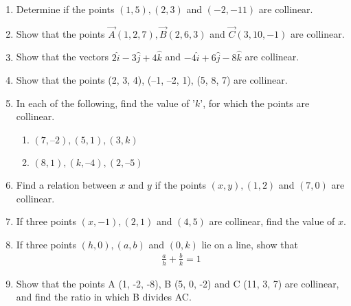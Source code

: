 \begin{enumerate}[label=\thesection.\arabic*,ref=\thesection.\theenumi]
\item Determine if the points $(1,5),(2,3)$ and $(-2,-11)$ are collinear.
	\\
		
\item Show that the points $\vec{A}(1,2,7), \vec{B}(2,6,3)$ and $\vec{C}(3,10,-1)$ are collinear.
	\\
	\solution
		
\item Show that the vectors $2\hat{i}-3\hat{j}+4\hat{k}$ and $-4\hat{i}+6\hat{j}-8\hat{k}$ are collinear.
   \\ 
    \solution 
		
\item Show that the points (2, 3, 4), (–1, –2, 1), (5, 8, 7) are collinear.
		\\
		\solution
		
\item In each of the following, find the value of '$k$', for which the points are collinear.
\begin{enumerate}
\item $(7, –2), (5, 1), (3, k)$
\item $(8, 1), (k, – 4), (2, –5)$
\end{enumerate}
		\label{10/7/3/2}
\solution
		
\item Find a relation between $x$ and $y$ if the points $(x, y), (1, 2)$  and  $(7, 0)$ are collinear.
\\
\solution
	
\item If three points $(x, -1), (2, 1)$ and $(4, 5)$ are collinear, find the value of $x$.
\label{chapters/11/10/1/8}

\item If three points $(h, 0), (a, b)$ and $(0, k)$ lie on a line, 
show that 
\begin{align}
\frac{a}{h}+\frac{b}{k}=1
\end{align}
\label{chapters/11/10/1/13}

\item Show that the points A (1, -2, -8), B (5, 0, -2) and C (11, 3, 7) are collinear, and find the ratio in which B divides AC.\\
\end{enumerate}

